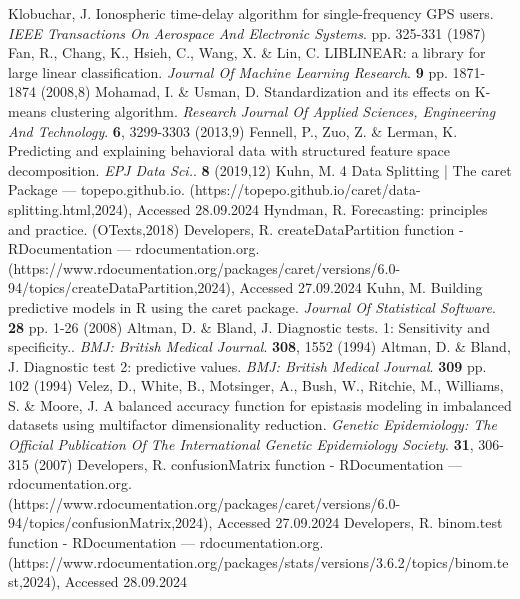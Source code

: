 \documentclass[sn-mathphys-num]{sn-jnl}%
\begin{document}
\begin{thebibliography}{000}
Klobuchar, J. Ionospheric time-delay algorithm for single-frequency GPS users. {\em IEEE Transactions On Aerospace And Electronic Systems}. pp. 325-331 (1987)
Fan, R., Chang, K., Hsieh, C., Wang, X. \& Lin, C. LIBLINEAR: a library for large linear classification. {\em Journal Of Machine Learning Research}. \textbf{9} pp. 1871-1874 (2008,8)
Mohamad, I. \& Usman, D. Standardization and its effects on K-means clustering algorithm. {\em Research Journal Of Applied Sciences, Engineering And Technology}. \textbf{6}, 3299-3303 (2013,9)
Fennell, P., Zuo, Z. \& Lerman, K. Predicting and explaining behavioral data with structured feature space decomposition. {\em EPJ Data Sci.}. \textbf{8} (2019,12)
Kuhn, M. 4 Data Splitting | The caret Package — topepo.github.io. (https://topepo.github.io/caret/data-splitting.html,2024), Accessed 28.09.2024
Hyndman, R. Forecasting: principles and practice. (OTexts,2018)
Developers, R. createDataPartition function - RDocumentation — rdocumentation.org. (https://www.rdocumentation.org/packages/caret/versions/6.0-94/topics/createDataPartition,2024), Accessed 27.09.2024
Kuhn, M. Building predictive models in R using the caret package. {\em Journal Of Statistical Software}. \textbf{28} pp. 1-26 (2008)
Altman, D. \& Bland, J. Diagnostic tests. 1: Sensitivity and specificity.. {\em BMJ: British Medical Journal}. \textbf{308}, 1552 (1994)
Altman, D. \& Bland, J. Diagnostic test 2: predictive values. {\em BMJ: British Medical Journal}. \textbf{309} pp. 102 (1994)
Velez, D., White, B., Motsinger, A., Bush, W., Ritchie, M., Williams, S. \& Moore, J. A balanced accuracy function for epistasis modeling in imbalanced datasets using multifactor dimensionality reduction. {\em Genetic Epidemiology: The Official Publication Of The International Genetic Epidemiology Society}. \textbf{31}, 306-315 (2007)
Developers, R. confusionMatrix function - RDocumentation — rdocumentation.org. (https://www.rdocumentation.org/packages/caret/versions/6.0-94/topics/confusionMatrix,2024), Accessed 27.09.2024
Developers, R. binom.test function - RDocumentation — rdocumentation.org. (https://www.rdocumentation.org/packages/stats/versions/3.6.2/topics/binom.test,2024), Accessed 28.09.2024

\end{thebibliography}
\end{document}

